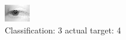 \begin{figure}[h!]
\begin{center}
\includegraphics[width=0.60\columnwidth]{figures/ID2680_class_3_target_4.png}
\end{center}
\caption{ Classification: 3 actual target: 4}
\label{fig:ID2680_class_3_target_4}
\end{figure}
